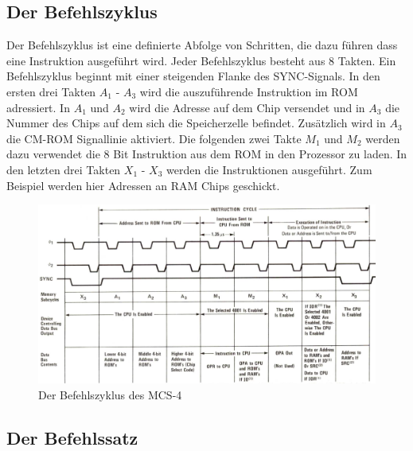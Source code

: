\subsection{Der Befehlszyklus}
\label{ch:befehlszyklus}
Der Befehlszyklus ist eine definierte Abfolge von Schritten, die dazu führen dass eine Instruktion ausgeführt wird. Jeder Befehlszyklus besteht aus 8 Takten. Ein Befehlszyklus beginnt mit einer steigenden Flanke des SYNC-Signals. In den ersten drei Takten $A_1$ - $A_3$ wird die auszuführende Instruktion im ROM adressiert. In $A_1$ und $A_2$ wird die Adresse auf dem Chip versendet und in $A_3$ die Nummer des Chips auf dem sich die Speicherzelle befindet. Zusätzlich wird in $A_3$ die CM-ROM Signallinie aktiviert. Die folgenden zwei Takte $M_1$ und $M_2$ werden dazu verwendet die 8 Bit Instruktion aus dem ROM in den Prozessor zu laden. In den letzten drei Takten $X_1$ - $X_3$ werden die Instruktionen ausgeführt. Zum Beispiel werden hier Adressen an RAM Chips geschickt.
 \begin{figure}[h]
 	\centering
 	\includegraphics[width=1\textwidth]{figures/instruction_cycle.png}
 	\caption{Der Befehlszyklus des MCS-4}
 	\label{fig:cycle}
 \end{figure}

\subsection{Der Befehlssatz}
\label{ch:befehlssatz}